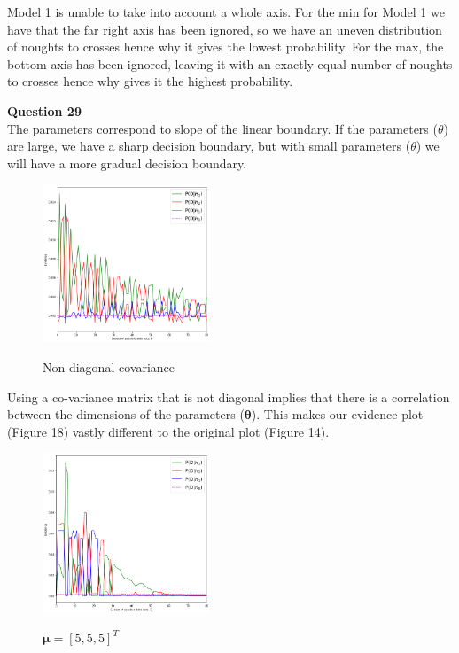 \documentclass[10pt, a4paper, twocolumn]{article} %
\begin{document}
\begin{enumerate}
Model 1 is unable to take into account a whole axis. For the min for Model 1 we have that the far right axis has been ignored, so we have an uneven distribution of noughts to crosses hence why it gives the lowest probability. For the max, the bottom axis has been ignored, leaving it with an exactly equal number of noughts to crosses hence why gives it the highest probability.


  
  
  \textbf{Question 29}\\
  
  The parameters correspond to slope of the linear boundary. If the parameters ($\theta$) are large, we have a sharp decision boundary, but with small parameters ($\theta$) we will have a more gradual decision boundary.
  
  
   \begin{figure}[H]
      \centering
      \includegraphics[width=50mm,scale=0.3]{imagesfinal/29partnond.png}
      \label{fig:example}
      \caption{Non-diagonal covariance}
  \end{figure}
  
  Using a co-variance matrix that is not diagonal implies that there is a correlation between the dimensions of the parameters ($\mathbf{\theta}$). This makes our evidence plot (Figure 18) vastly different to the original plot (Figure 14).
  
  
  \begin{figure}[H]
      \centering
      \includegraphics[width=50mm,scale=0.3]{imagesfinal/29mupart.png}
      \label{fig:example}
      \caption{$\mathbf{\mu} = [5, 5, 5]^T$}
  \end{figure}
  

\end{enumerate}
\end{document}
